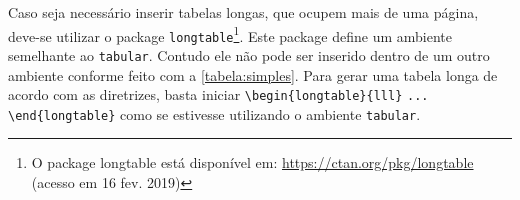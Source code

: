 \documentclass[
  12pt,		%
  a4paper,	%
  openright,%
  oneside,	%
  chapter=TITLE,		%
  section=TITLE,		%
  english,	%
  french,	%
  spanish,	%
  brazil
]{abntex2}
\begin{document}
         Caso seja necessário inserir tabelas longas, que ocupem mais de uma página, deve-se utilizar o package \verb|longtable|\footnote{O package longtable está disponível em: \url{https://ctan.org/pkg/longtable} (acesso em 16 fev. 2019)}. Este package define um ambiente semelhante ao \verb|tabular|. Contudo ele não pode ser inserido dentro de um outro ambiente conforme feito com a \autoref{tabela:simples}. Para gerar uma tabela longa de acordo com as diretrizes, basta iniciar \verb|\begin{longtable}{lll}| \verb|... \end{longtable}| como se estivesse utilizando o ambiente \verb|tabular|.
            
            
            \ABNTEXfontereduzida %
\end{document}
